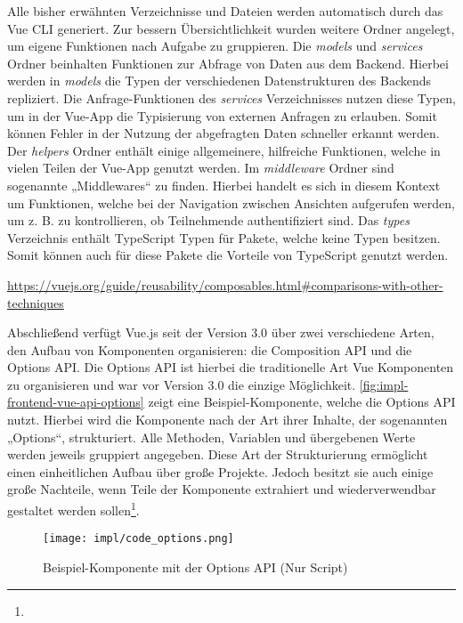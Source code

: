 Alle bisher erwähnten Verzeichnisse und Dateien werden automatisch durch das Vue
CLI generiert. Zur bessern Übersichtlichkeit wurden weitere Ordner angelegt, um
eigene Funktionen nach Aufgabe zu gruppieren. Die \textit{models} und
\textit{services} Ordner beinhalten Funktionen zur Abfrage von Daten aus dem
Backend. Hierbei werden in \textit{models} die Typen der verschiedenen
Datenstrukturen des Backends repliziert. Die Anfrage-Funktionen des
\textit{services} Verzeichnisses nutzen diese Typen, um in der Vue-App die
Typisierung von externen Anfragen zu erlauben. Somit können Fehler in der
Nutzung der abgefragten Daten schneller erkannt werden. Der \textit{helpers}
Ordner enthält einige allgemeinere, hilfreiche Funktionen, welche in vielen
Teilen der Vue-App genutzt werden. Im \textit{middleware} Ordner sind sogenannte
„Middlewares“ zu finden. Hierbei handelt es sich in diesem Kontext um
Funktionen, welche bei der Navigation zwischen Ansichten aufgerufen werden, um
z. B. zu kontrollieren, ob Teilnehmende authentifiziert sind. Das \textit{types}
Verzeichnis enthält TypeScript Typen für Pakete, welche keine Typen besitzen.
Somit können auch für diese Pakete die Vorteile von TypeScript genutzt werden.


\urldef\vuemixin\url{https://vuejs.org/guide/reusability/composables.html#comparisons-with-other-techniques}

Abschließend verfügt Vue.js seit der Version 3.0 über zwei verschiedene Arten,
den Aufbau von Komponenten organisieren: die Composition API und die Options
API. Die Options API ist hierbei die traditionelle Art Vue Komponenten zu
organisieren und war vor Version 3.0 die einzige Möglichkeit.
\autoref{fig:impl-frontend-vue-api-options} zeigt eine Beispiel-Komponente,
welche die Options API nutzt. Hierbei wird die Komponente nach der Art ihrer
Inhalte, der sogenannten „Options“, strukturiert. Alle Methoden, Variablen und
übergebenen Werte werden jeweils gruppiert angegeben. Diese Art der
Strukturierung ermöglicht einen einheitlichen Aufbau über große Projekte. Jedoch
besitzt sie auch einige große Nachteile, wenn Teile der Komponente extrahiert
und wiederverwendbar gestaltet werden sollen\footnote{\vuemixin}.

\begin{figure}[htpb]
    \centering
    \texttt{[image: impl/code\_options.png]}
    \caption{Beispiel-Komponente mit der Options API (Nur Script)}
    \label{fig:impl-frontend-vue-api-options}
\end{figure}

